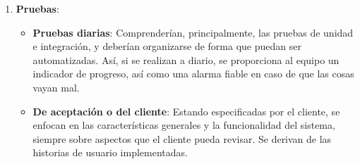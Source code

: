 \begin{enumerate}
   \item \textbf{Pruebas}:
         \begin{itemize}
            \item \textbf{Pruebas diarias}: Comprenderían, principalmente, las pruebas de unidad e integración, y deberían organizarse de forma que puedan ser automatizadas. Así, si se realizan a diario, se proporciona al equipo un indicador de progreso, así como una alarma fiable en caso de que las cosas vayan mal.
            \item \textbf{De aceptación o del cliente}: Estando especificadas por el cliente, se enfocan en las características generales y la funcionalidad del sistema, siempre sobre aspectos que el cliente pueda revisar. Se derivan de las historias de usuario implementadas.
         \end{itemize}
\end{enumerate}
